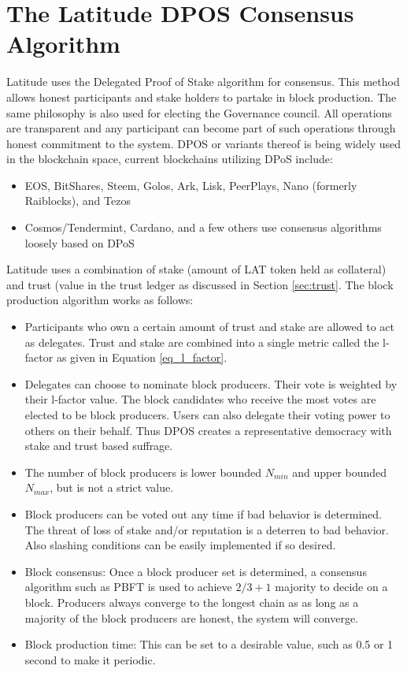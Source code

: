 \newpage
\section{The Latitude DPOS Consensus Algorithm}
\label{app:dpos}

Latitude uses the Delegated Proof of Stake algorithm for consensus. This method allows honest participants and stake
holders to partake in block production. The same philosophy is also used for electing the Governance council. All
operations are transparent and any participant can become part of such operations through honest commitment to the
system. DPOS or variants thereof is being widely used in the blockchain space, current blockchains utilizing DPoS include:

\begin{itemize}
\item EOS, BitShares, Steem, Golos, Ark, Lisk, PeerPlays, Nano (formerly Raiblocks), and Tezos
\item Cosmos/Tendermint, Cardano, and a few others use consensus algorithms loosely based on DPoS
\end{itemize}

Latitude uses a combination of stake (amount of LAT token held as collateral) and trust (value in the trust ledger as
discussed in Section \ref{sec:trust}. The block production algorithm works as follows:

\begin{itemize}
\item Participants who own a certain amount of trust and stake are allowed to act as delegates. Trust and stake are
    combined into a single metric called the l-factor as given in Equation \ref{eq_l_factor}.
\item Delegates can choose to nominate block producers. Their vote is weighted by their l-factor value. The block
    candidates who receive the most votes are elected to be block producers. Users can also delegate their voting power
        to others on their behalf. Thus DPOS creates a representative democracy with stake and trust based suffrage.
\item The number of block producers is lower bounded $N_{min}$ and upper bounded $N_{max}$, but is not a strict value.

\item Block producers can be voted out any time if bad behavior is determined. The threat of loss of stake and/or
    reputation is a deterren to bad behavior. Also slashing conditions can be easily implemented if so desired.
\item Block consensus: Once a block producer set is determined, a consensus algorithm such as PBFT is used to
    achieve $2/3 +1$ majority to decide on a block. Producers always converge to the longest chain as as long as a
        majority of the block producers are honest, the system will converge.
\item Block production time: This can be set to a desirable value, such as 0.5 or 1 second to make it periodic.
\end{itemize}

